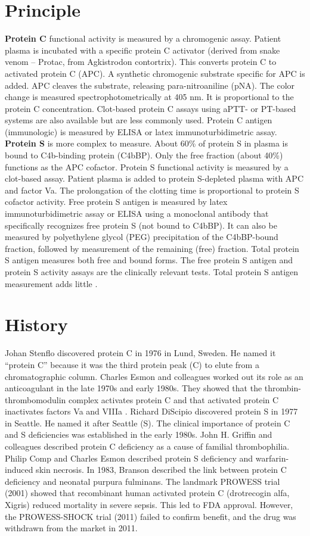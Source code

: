 \section*{Principle}
\textbf{Protein C} functional activity is measured by a chromogenic assay. Patient plasma is incubated with a specific protein C activator (derived from snake venom -- Protac, from Agkistrodon contortrix). This converts protein C to activated protein C (APC). A synthetic chromogenic substrate specific for APC is added. APC cleaves the substrate, releasing para-nitroaniline (pNA). The color change is measured spectrophotometrically at 405 nm. It is proportional to the protein C concentration. Clot-based protein C assays using aPTT- or PT-based systems are also available but are less commonly used. Protein C antigen (immunologic) is measured by ELISA or latex immunoturbidimetric assay. \textbf{Protein S} is more complex to measure. About 60\% of protein S in plasma is bound to C4b-binding protein (C4bBP). Only the free fraction (about 40\%) functions as the APC cofactor. Protein S functional activity is measured by a clot-based assay. Patient plasma is added to protein S-depleted plasma with APC and factor Va. The prolongation of the clotting time is proportional to protein S cofactor activity. Free protein S antigen is measured by latex immunoturbidimetric assay or ELISA using a monoclonal antibody that specifically recognizes free protein S (not bound to C4bBP). It can also be measured by polyethylene glycol (PEG) precipitation of the C4bBP-bound fraction, followed by measurement of the remaining (free) fraction. Total protein S antigen measures both free and bound forms. The free protein S antigen and protein S activity assays are the clinically relevant tests. Total protein S antigen measurement adds little \cite{tietz2012textbook}.

\section*{History}
Johan Stenflo discovered protein C in 1976 in Lund, Sweden. He named it ``protein C'' because it was the third protein peak (C) to elute from a chromatographic column. Charles Esmon and colleagues worked out its role as an anticoagulant in the late 1970s and early 1980s. They showed that the thrombin-thrombomodulin complex activates protein C and that activated protein C inactivates factors Va and VIIIa \cite{esmon2003protein}. Richard DiScipio discovered protein S in 1977 in Seattle. He named it after Seattle (S). The clinical importance of protein C and S deficiencies was established in the early 1980s. John H. Griffin and colleagues described protein C deficiency as a cause of familial thrombophilia. Philip Comp and Charles Esmon described protein S deficiency and warfarin-induced skin necrosis. In 1983, Branson described the link between protein C deficiency and neonatal purpura fulminans. The landmark PROWESS trial (2001) showed that recombinant human activated protein C (drotrecogin alfa, Xigris) reduced mortality in severe sepsis. This led to FDA approval. However, the PROWESS-SHOCK trial (2011) failed to confirm benefit, and the drug was withdrawn from the market in 2011.

